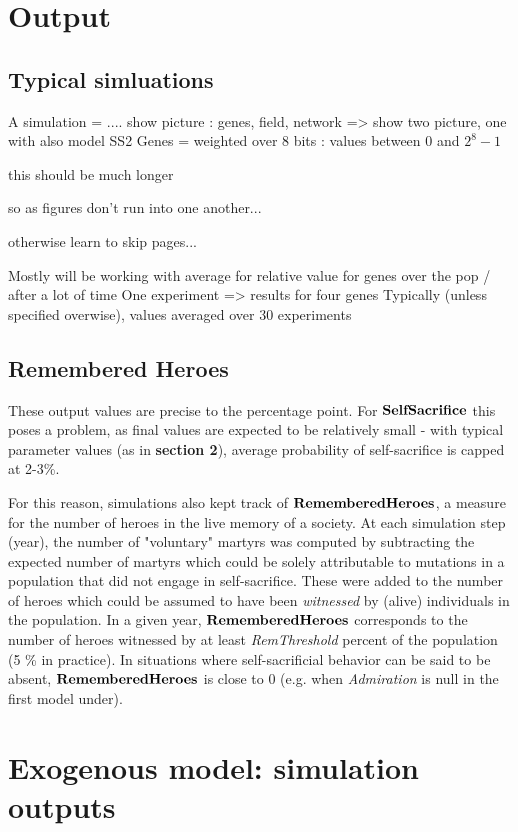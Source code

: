 \documentclass[a4paper,12pt]{report}
\begin{document}
\section{Output}
\subsection{Typical simluations}

A simulation = .... show picture : genes, field, network
=> show two picture, one with also model SS2
Genes = weighted over 8 bits : values between $0$ and $2^8 - 1$

this should be much longer


so as figures don't run into one another... 

otherwise learn to skip pages...

Mostly will be working with average for relative value for genes over the pop / after a lot of time
One experiment => results for four genes
Typically (unless specified overwise), values averaged over 30 experiments

\subsection{Remembered Heroes}
\label{ss:RH}
These output values are precise to the percentage point. 
For $\bf{SelfSacrifice}$ this poses a problem, as final values are expected to be relatively
small - with typical parameter values (as in \textbf{section 2}), average probability of self-sacrifice
 is capped at 2-3\%.

For this reason, simulations also kept track of $\bf{RememberedHeroes}$, a measure for the number of heroes 
in the live memory of a society. At each simulation step (year), the number of "voluntary" martyrs was computed
 by subtracting the expected number of martyrs which could be solely attributable to mutations in a population
 that did not engage in self-sacrifice. These were added to the number of heroes which could be assumed to have
 been \emph{witnessed} by (alive) individuals in the population. In a given year, $\bf{RememberedHeroes}$ corresponds
 to the number of heroes witnessed by at least \emph{RemThreshold} percent of the population (5 \% in practice).
 In situations where self-sacrificial behavior can be said to be absent, $\bf{RememberedHeroes}$ is close to 0
 (e.g. when \emph{Admiration} is null in the first model under).

\section{Exogenous model: simulation outputs}
\end{document}
